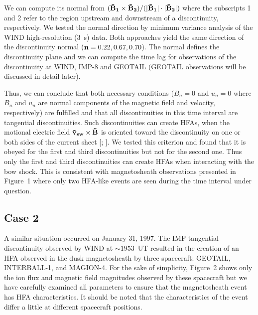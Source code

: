 \documentclass[11pt]{article}
\begin{document}
\begin{article}


We can compute its normal from $({\bf \vec B_1\times \vec
B_2})/({\bf |\vec B_1| \cdot |\vec B_2|})$ where the subscripts 1
and 2 refer to the region upstream and downstream of a
discontinuity, respectively. We tested the normal direction by
minimum variance analysis of the WIND high-resolution (3~s) data.
Both approaches yield the same direction of the discontinuity
normal (${\bf n} = 0.22, 0.67, 0.70$).
The normal defines the discontinuity plane and we can compute
the time lag for observations of the discontinuity at
WIND, IMP-8 and GEOTAIL (GEOTAIL observations will be discussed
in detail later).

Thus, we can conclude that both necessary conditions ($B_n = 0$ and
$u_n = 0$ where $B_n$ and $u_n$ are normal components of the magnetic field
and velocity, respectively) are fulfilled and that all
discontinuities in this time interval are tangential
discontinuities. Such discontinuities can create HFAs, when the
motional electric field ${\bf \vec v_{sw} \times \vec B}$ is oriented
toward the discontinuity
on one or both sides of the current sheet [; ].
We tested this criterion and found that it is obeyed for the first
and third discontinuities but not for the second one.
Thus only the first and third discontinuities can create HFAs
when interacting with the bow shock.
This is consistent with magnetosheath observations presented in
Figure~1 where only two HFA-like events are seen during the time
interval under question.

\subsection{Case 2}
A similar situation occurred on January 31, 1997. The IMF
tangential discontinuity observed by WIND at $\sim 1953$~UT resulted
in the creation of an HFA observed in the dusk
magnetosheath by three spacecraft: GEOTAIL, INTERBALL-1, and
MAGION-4. For the sake of simplicity, Figure~2 shows only the ion
flux and magnetic field magnitudes observed by these
spacecraft but we have carefully examined all parameters to ensure
that the magnetosheath event has  HFA characteristics. It should be
noted that the characteristics of the event differ a little at
different spacecraft positions.


\end{article}
\end{document}
